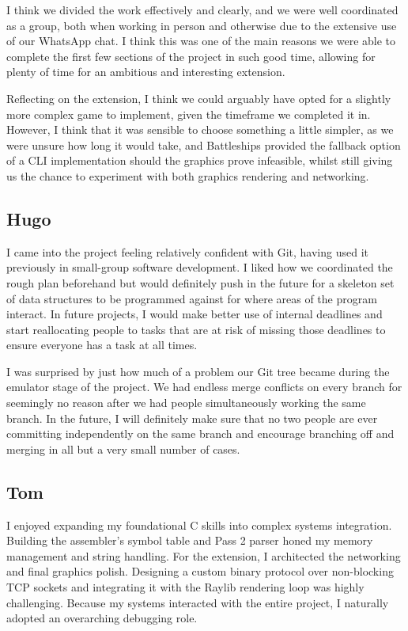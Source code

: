 \documentclass[11pt]{article}
\begin{document}
I think we divided the work effectively and clearly, and we were well coordinated as a group, both when working in person and otherwise due to the extensive use of our WhatsApp chat. I think this was one of the main reasons we were able to complete the first few sections of the project in such good time, allowing for plenty of time for an ambitious and interesting extension.

Reflecting on the extension, I think we could arguably have opted for a slightly more complex game to implement, given the timeframe we completed it in. However, I think that it was sensible to choose something a little simpler, as we were unsure how long it would take, and Battleships provided the fallback option of a CLI implementation should the graphics prove infeasible, whilst still giving us the chance to experiment with both graphics rendering and networking.
\subsection{Hugo}
I came into the project feeling relatively confident with Git, having used it previously in small-group software development. I liked how we coordinated the rough plan beforehand but would definitely push in the future for a skeleton set of data structures to be programmed against for where areas of the program interact. In future projects, I would make better use of internal deadlines and start reallocating people to tasks that are at risk of missing those deadlines to ensure everyone has a task at all times.

I was surprised by just how much of a problem our Git tree became during the emulator stage of the project. We had endless merge conflicts on every branch for seemingly no reason after we had people simultaneously working the same branch. In the future, I will definitely make sure that no two people are ever committing independently on the same branch and encourage branching off and merging in all but a very small number of cases.

\subsection{Tom}
I enjoyed expanding my foundational C skills into complex systems integration. Building the assembler's symbol table and Pass 2 parser honed my memory management and string handling. For the extension, I architected the networking and final graphics polish. Designing a custom binary protocol over non-blocking TCP sockets and integrating it with the Raylib rendering loop was highly challenging. Because my systems interacted with the entire project, I naturally adopted an overarching debugging role.
\end{document}
